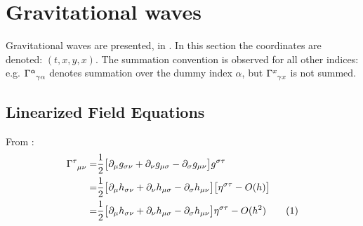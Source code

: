 \documentclass[]{article}
\newcommand\numberthis{\addtocounter{equation}{1}\tag{\theequation}}
\begin{document}
\section{Gravitational waves}\label{sec:gravitational:waves}

Gravitational waves are presented, in \cite[Lecture 10]{susskind2012general}.
In this section the coordinates are denoted: $(t,x,y,x)$. The summation convention is observed for all other indices: e.g. $\Gamma\indices{^\alpha_{\gamma\alpha}}$ denotes summation over the dummy index $\alpha$, but $\Gamma\indices{^x_{\gamma x}}$ is not summed.
\subsection{Linearized Field Equations}

From \cite[Lecture 10]{susskind2012general}:
\begin{align*}
	\Gamma\indices{^{\tau}_{\mu\nu}} =&\frac{1}{2} \big[ \partial_\mu g_{\sigma\nu} + \partial_\nu g_{\mu\sigma} - \partial_\sigma g_{\mu\nu}\big] g^{\sigma\tau}\\
	=& \frac{1}{2} \big[ \partial_\mu h_{\sigma\nu} + \partial_\nu h_{\mu\sigma} - \partial_\sigma h_{\mu\nu}\big] \big[\eta^{\sigma\tau }- O(h)\big]\\
	=& \frac{1}{2} \big[ \partial_\mu h_{\sigma\nu} + \partial_\nu h_{\mu\sigma} - \partial_\sigma h_{\mu\nu}\big] \eta^{\sigma\tau }- O(h^2) \numberthis \label{eq:Gamma:small}
\end{align*}
\end{document}
